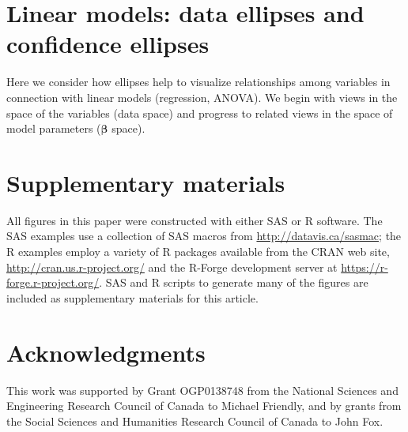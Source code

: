 \documentclass[11pt]{article}%
\renewcommand*{\vec}[1]{\ensuremath{\bm{#1}}}     %
\begin{document}







\section{Linear models: data ellipses and confidence ellipses}

Here we consider how ellipses help to visualize relationships among variables
in connection with linear models (regression, ANOVA).
We begin with views in the space of the variables (data space)
and progress to related views in the space of model parameters
($\vec{\beta}$ space).























\section{Supplementary materials}

All figures in this paper were constructed with either SAS or R software.
The SAS examples use a collection of SAS macros from \url{http://datavis.ca/sasmac}; the
R examples employ a variety of R packages available from the CRAN web site, \url{http://cran.us.r-project.org/}
and the R-Forge development server at \url{https://r-forge.r-project.org/}.
SAS and R scripts to generate many of the figures are included as supplementary materials for this article.


\section{Acknowledgments}

This work was supported by Grant OGP0138748 from the National Sciences and Engineering Research Council of Canada to Michael Friendly, 
and by grants from the Social Sciences and Humanities Research Council of Canada to John Fox.


%
\end{document}
